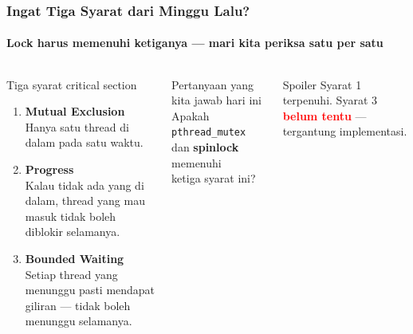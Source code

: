 \documentclass[t,aspectratio=169,xcolor=dvipsnames]{beamer}
\newcommand{\tem}[1]{\textbf{\textcolor{red}{#1}}}
\begin{document}
\begin{frame}[shrink=5]
    \frametitle{Ingat Tiga Syarat dari Minggu Lalu?}
    \framesubtitle{Lock harus memenuhi ketiganya — mari kita periksa satu per satu}
    \footnotesize

    \begin{columns}[T]
        \begin{block}{Tiga syarat critical section}
            \begin{enumerate}
                \item \textbf{Mutual Exclusion}\\
                      Hanya satu thread di dalam pada satu waktu.
                \vspace{0.3em}
                \item \textbf{Progress}\\
                      Kalau tidak ada yang di dalam, thread yang mau masuk tidak boleh diblokir selamanya.
                \vspace{0.3em}
                \item \textbf{Bounded Waiting}\\
                      Setiap thread yang menunggu pasti mendapat giliran — tidak boleh menunggu selamanya.
            \end{enumerate}
        \end{block}

        \begin{exampleblock}{Pertanyaan yang kita jawab hari ini}
            \centering
            Apakah \texttt{pthread\_mutex}\\
            dan \textbf{spinlock} memenuhi\\
            ketiga syarat ini?
        \end{exampleblock}

        \begin{alertblock}{Spoiler}
            Syarat 1 terpenuhi. Syarat 3 \tem{belum tentu} — tergantung implementasi.
        \end{alertblock}
    \end{columns}
\end{frame}
\end{document}
